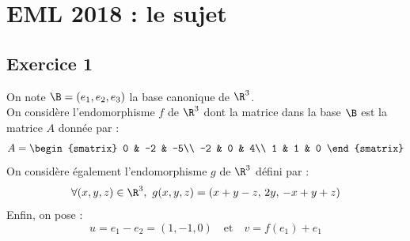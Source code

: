 \chapter*{EML 2018 : le sujet}
  
%

\section*{Exercice 1}

\noindent
On note $\B=(e_1,e_2,e_3)$ la base canonique de $\R^3$.\\
On considère l'endomorphisme $f$ de $\R^3$ dont la matrice dans la base 
$\B$ est la matrice $A$ donnée par :
\[
  A =
  \begin{smatrix}
    0 & -2 & -5\\
    -2 & 0 & 4\\
    1 & 1 & 0
  \end{smatrix}
\]
On considère également l'endomorphisme $g$ de $\R^3$ défini par :
\[
  \forall (x,y,z) \in \R^3, \ g(x,y,z) = (x+y-z, \, 2y, \, -x+y+z)
\]
Enfin, on pose : 
\[
  u=e_1-e_2=(1,-1,0) \quad \text{et} \quad v=f(e_1)+e_1
\]


